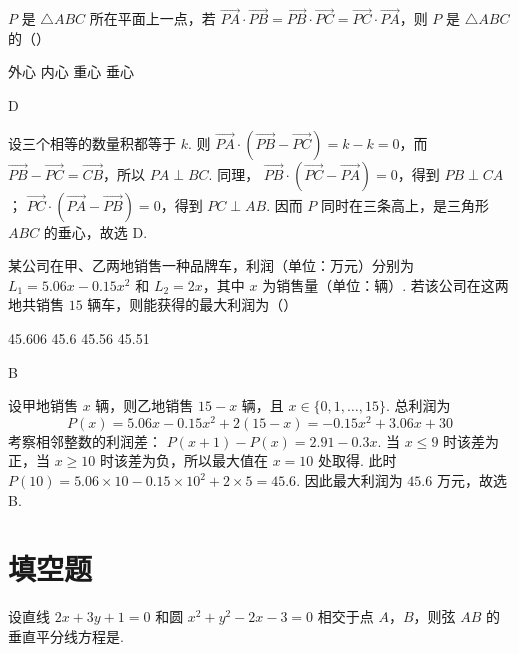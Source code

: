 \begin{problem}
\(P\) 是 \(\triangle ABC\) 所在平面上一点，若 \(\overrightarrow{PA} \cdot \overrightarrow{PB} = \overrightarrow{PB} \cdot \overrightarrow{PC} = \overrightarrow{PC} \cdot \overrightarrow{PA}\)，则 \(P\) 是 \(\triangle ABC\) 的（\quad）

\choices
    {外心}
    {内心}
    {重心}
    {垂心}
\end{problem}

\begin{answer}
D
\end{answer}

\begin{solution}
设三个相等的数量积都等于 \(k\). 则
\(\overrightarrow{PA}\cdot(\overrightarrow{PB}-\overrightarrow{PC})=k-k=0\)，而 \(\overrightarrow{PB}-\overrightarrow{PC}=\overrightarrow{CB}\)，所以 \(PA\perp BC\). 同理，
\(\overrightarrow{PB}\cdot(\overrightarrow{PC}-\overrightarrow{PA})=0\)，得到 \(PB\perp CA\)；
\(\overrightarrow{PC}\cdot(\overrightarrow{PA}-\overrightarrow{PB})=0\)，得到 \(PC\perp AB\). 因而 \(P\) 同时在三条高上，是三角形 \(ABC\) 的垂心，故选 D.
\end{solution}

\begin{problem}
某公司在甲、乙两地销售一种品牌车，利润（单位：万元）分别为 \(L_{1} = 5.06x - 0.15x^{2}\) 和 \(L_{2} = 2x\)，其中 \(x\) 为销售量（单位：辆）. 若该公司在这两地共销售 \(15\) 辆车，则能获得的最大利润为（\quad）

\choices
    {45.606}
    {45.6}
    {45.56}
    {45.51}
\end{problem}

\begin{answer}
B
\end{answer}

\begin{solution}
设甲地销售 \(x\) 辆，则乙地销售 \(15-x\) 辆，且 \(x\in\{0,1,\ldots,15\}\). 总利润为
\[
P(x)=5.06x-0.15x^2+2(15-x)=-0.15x^2+3.06x+30
\]
考察相邻整数的利润差：
\(P(x+1)-P(x)=2.91-0.3x\). 当 \(x\leqslant9\) 时该差为正，当 \(x\geqslant10\) 时该差为负，所以最大值在 \(x=10\) 处取得. 此时
\(P(10)=5.06\times10-0.15\times10^2+2\times5=45.6\). 因此最大利润为 \(45.6\) 万元，故选 B.
\end{solution}

\section{填空题}
\begin{problem}
设直线 \(2x + 3y + 1 = 0\) 和圆 \(x^{2} + y^{2} - 2x - 3 = 0\) 相交于点 \(A\)，\(B\)，则弦 \(AB\) 的垂直平分线方程是\fillinblank{}.
\end{problem}

